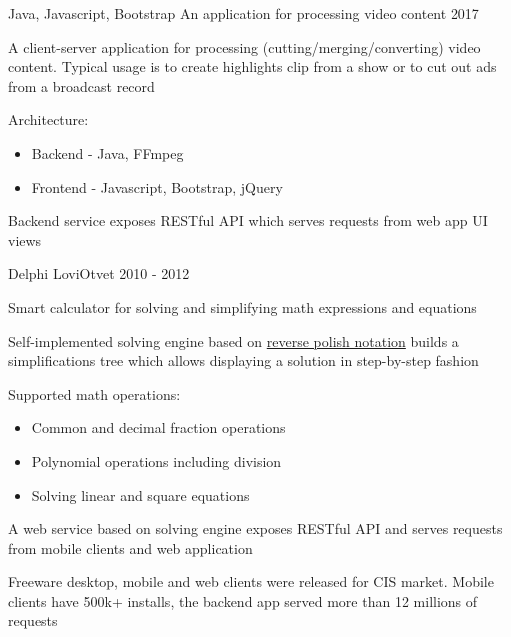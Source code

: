 \begin{cventries}
  \cventry
    {Java, Javascript, Bootstrap}
    {An application for processing video content}
    {}
    {2017}
    {
      \begin{cvitems} %
      	\item A client-server application for processing (cutting/merging/converting) video content. Typical usage is to create highlights clip from a show or to cut out ads from a broadcast record
        \item Architecture:
          \begin{itemize}[label={•},leftmargin=10pt]
              \item Backend - Java, FFmpeg
              \item Frontend - Javascript, Bootstrap, jQuery
          \end{itemize}
		\item Backend service exposes RESTful API which serves requests from web app UI views
      \end{cvitems}
    }

  \cventry
  {Delphi}
  {LoviOtvet}
  {}
  {2010 - 2012}
  {
      \begin{cvitems} %
          \item Smart calculator for solving and simplifying math expressions and equations
          \item Self-implemented solving engine based on {\color{awesome-skyblue}\href{https://en.wikipedia.org/wiki/Reverse_Polish_notation}{reverse polish notation}} builds a simplifications tree which allows displaying a solution in step-by-step fashion
          \item Supported math operations:
          \begin{itemize}[label={•},leftmargin=10pt]
              \item Common and decimal fraction operations
              \item Polynomial operations including division
              \item Solving linear and square equations
          \end{itemize}
          \item A web service based on solving engine exposes RESTful API and serves requests from mobile clients and web application
          \item Freeware desktop, mobile and web clients were released for CIS market. Mobile clients have 500k+ installs, the backend app served more than 12 millions of requests
      \end{cvitems}
  }


\end{cventries}
